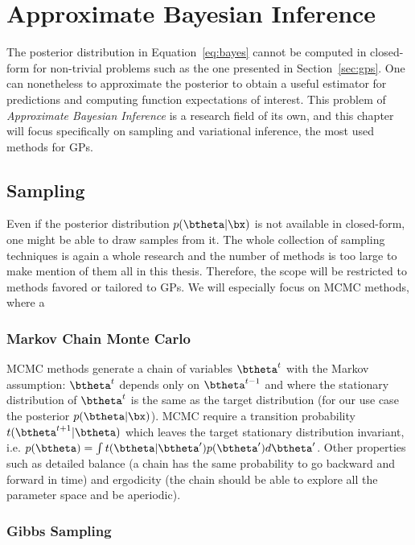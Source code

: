 \section{Approximate Bayesian Inference}
\label{sec:approx_inf}
The posterior distribution in Equation~\eqref{eq:bayes} cannot be computed in closed-form for non-trivial problems such as the one presented in Section~\ref{sec:gps}.
One can nonetheless to approximate the posterior to obtain a useful estimator for predictions and computing function expectations of interest.
This problem of \textit{Approximate Bayesian Inference} is a research field of its own, and this chapter will focus specifically on sampling and variational inference, the most used methods for \ac{GPs}.

\subsection{Sampling}

Even if the posterior distribution $p(\btheta|\bx)$ is not available in closed-form, one might be able to draw samples from it.
The whole collection of sampling techniques is again a whole research and the number of methods is too large to make mention of them all in this thesis.
Therefore, the scope will be restricted to methods favored or tailored to \ac{GPs}.
We will especially focus on \ac{MCMC} methods, where a
\subsubsection{Markov Chain Monte Carlo}

\acf{MCMC} methods generate a chain of variables $\btheta^t$ with the Markov assumption: $\btheta^t$ depends only on $\btheta^{t-1}$ and where the stationary distribution of $\btheta^t$ is the same as the target distribution (for our use case the posterior $p(\btheta|\bx)$).
\ac{MCMC} require a transition probability $t(\btheta^{t+1}|\btheta)$ which leaves the target stationary distribution invariant, i.e. $p(\btheta) = \int t(\btheta|\btheta')p(\btheta')d\btheta'$.
Other properties such as detailed balance (a chain has the same probability to go backward and forward in time) and ergodicity (the chain should be able to explore all the parameter space and be aperiodic).

\subsubsection{Gibbs Sampling}

